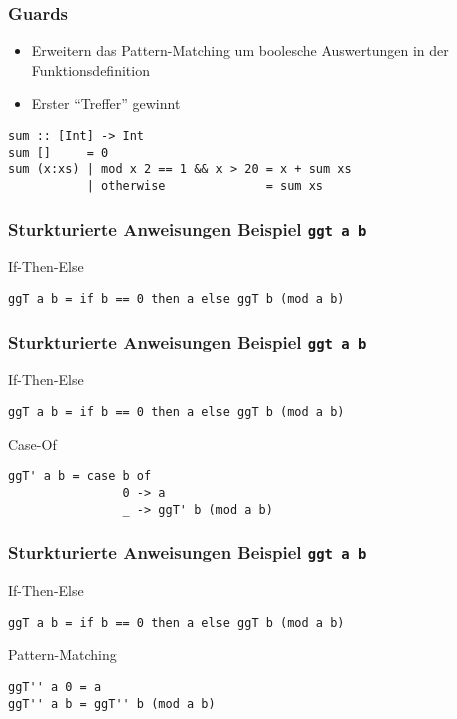 \begin{frame}[fragile]
\frametitle{Guards}
\begin{block}{\vspace*{-3ex}}
\begin{itemize}
  \item Erweitern das Pattern-Matching um boolesche Auswertungen in der Funktionsdefinition
  \item Erster "`Treffer"' gewinnt
\end{itemize}
\end{block}
\pause
\begin{lstlisting}
sum :: [Int] -> Int
sum []     = 0
sum (x:xs) | mod x 2 == 1 && x > 20 = x + sum xs
           | otherwise              = sum xs
\end{lstlisting}
\end{frame}

\begin{frame}[fragile]
\frametitle{Sturkturierte Anweisungen Beispiel \lstinline|ggt a b|}
\begin{block}{If-Then-Else}
\begin{lstlisting}
ggT a b = if b == 0 then a else ggT b (mod a b)
\end{lstlisting}
\end{block}
\end{frame}

\begin{frame}[fragile]
\frametitle{Sturkturierte Anweisungen Beispiel \lstinline|ggt a b|}
\begin{block}{If-Then-Else}
\begin{lstlisting}
ggT a b = if b == 0 then a else ggT b (mod a b)
\end{lstlisting}
\end{block}
\begin{block}{Case-Of}
\begin{lstlisting}
ggT' a b = case b of 
                0 -> a
                _ -> ggT' b (mod a b)
\end{lstlisting}
\end{block}
\end{frame}

\begin{frame}[fragile]
\frametitle{Sturkturierte Anweisungen Beispiel \lstinline|ggt a b|}
\begin{block}{If-Then-Else}
\begin{lstlisting}
ggT a b = if b == 0 then a else ggT b (mod a b)
\end{lstlisting}
\end{block}
\begin{block}{Pattern-Matching}
\begin{lstlisting}
ggT'' a 0 = a
ggT'' a b = ggT'' b (mod a b)
\end{lstlisting}
\end{block}
\end{frame}

